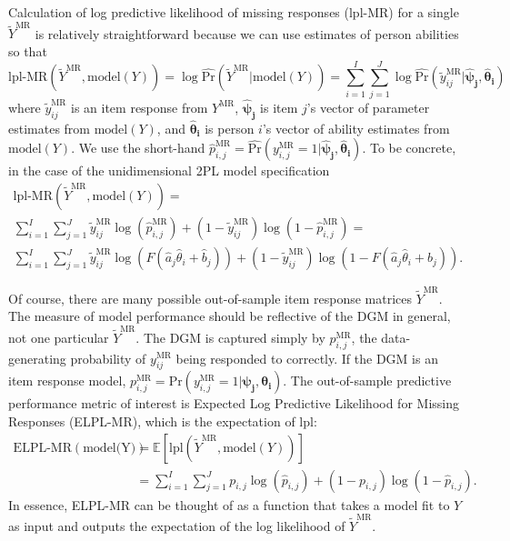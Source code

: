 \documentclass[
  english,
  man,floatsintext]{apa7}
\begin{document}
Calculation of log predictive likelihood of missing responses (lpl-MR) for a single \(\tilde Y^{\text{MR}}\) is relatively straightforward because we can use estimates of person abilities so that
\begin{equation}
\text{lpl-MR}(\tilde Y^{\text{MR}}, \text{model}(Y)) = \log \hat{\text{Pr}}(\tilde Y^{\text{MR}} | \text{model}(Y)) = \sum_{i=1}^{I} \sum_{j=1}^{J} \log \hat{\text{Pr}}(\tilde y_{ij}^{\text{MR}} | \bm{\hat\psi_j}, \bm{\hat\theta_i})
\end{equation}
where \(\tilde y_{ij}^{\text{MR}}\) is an item response from \(Y^{\text{MR}}\), \(\bm{\hat\psi_j}\) is item \(j\)'s vector of parameter estimates from \(\text{model}(Y)\), and \(\bm{\hat\theta_i}\) is person \(i\)'s vector of ability estimates from \(\text{model}(Y)\). We use the short-hand \(\hat p_{i, j}^{\text{MR}} = \hat{\text{Pr}}(y_{i, j}^{\text{MR}} = 1 | \bm{\hat\psi_j}, \bm{\hat\theta_i})\). To be concrete, in the case of the unidimensional 2PL model specification
\begin{equation}
\begin{aligned}
\text{lpl-MR}(\tilde Y^{\text{MR}}, \text{model}(Y)) = \\ \sum_{i=1}^{I} \sum_{j=1}^{J} \tilde y_{ij}^{\text{MR}} \log \left(\hat p_{i, j}^{\text{MR}}\right) + (1 - \tilde y_{ij}^{\text{MR}})\log\left(1 - \hat p_{i, j}^{\text{MR}}\right) = \\\sum_{i=1}^{I} \sum_{j=1}^{J} \tilde y_{ij}^{\text{MR}} \log \left(F(\hat a_j\hat \theta_i + \hat b_j)\right) + (1 - \tilde y_{ij}^{\text{MR}})\log\left(1 - F(\hat a_j\hat \theta_i + \hat b_j)\right).
\end{aligned}
\end{equation}

Of course, there are many possible out-of-sample item response matrices \(\tilde Y^{\text{MR}}\). The measure of model performance should be reflective of the DGM in general, not one particular \(\tilde Y^{\text{MR}}\). The DGM is captured simply by \(p_{i, j}^{\text{MR}}\), the data-generating probability of \(y_{ij}^{\text{MR}}\) being responded to correctly. If the DGM is an item response model, \(p_{i, j}^{\text{MR}} = \text{Pr}(y_{i, j}^{\text{MR}} = 1 | \bm{\psi_j}, \bm{\theta_i})\). The out-of-sample predictive performance metric of interest is Expected Log Predictive Likelihood for Missing Responses (ELPL-MR), which is the expectation of lpl:
\begin{equation}
\begin{aligned}
\text{ELPL-MR}(\text{model(Y)}) &= \mathbb{E}\left[\text{lpl}(\tilde Y^{\text{MR}}, \text{model}(Y))\right] \\ &= \sum_{i=1}^{I} \sum_{j=1}^{J} p_{i, j} \log (\hat p_{i, j}) + (1 - {p_{i, j}})\log(1 - \hat p_{i, j}) \label{eq:elplmr2}.
\end{aligned}
\end{equation}
In essence, ELPL-MR can be thought of as a function that takes a model fit to \(Y\) as input and outputs the expectation of the log likelihood of \(\tilde Y^{\text{MR}}\).
\end{document}

